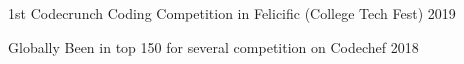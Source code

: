 \begin{cvhonors}

\cvhonor
{1st} %
{Codecrunch Coding Competition in Felicific (College Tech Fest)} %
{} %
{2019} %


\cvhonor
{Globally} %
{Been in top 150 for several competition on Codechef} %
{} %
{2018} %










\end{cvhonors}